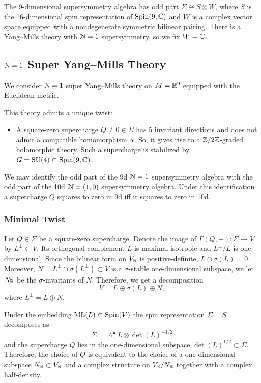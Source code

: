 \documentclass[10pt, oneside]{article}
\newcommand{\ML}{\mathrm{ML}}
\begin{document}
The 9-dimensional supersymmetry algebra has odd part $\Sigma\cong S\otimes W$, where $S$ is the 16-dimensional spin representation of $\mathrm{Spin}(9, \mathbb C)$ and $W$ is a complex vector space equipped with a nondegenerate symmetric bilinear pairing. There is a Yang--Mills theory with $\mathcal{N}=1$ supersymmetry, so we fix $W = \mathbb C$.

\subsection{\texorpdfstring{$\mathcal N=1$}{N=1} Super Yang--Mills Theory}

We consider $\mathcal N=1$ super Yang--Mills theory on $M=\mathbb R^9$ equipped with the Euclidean metric.

This theory admits a unique twist:
\begin{itemize}
\item A square-zero supercharge $Q\neq 0\in\Sigma$ has 5 invariant directions and does not admit a compatible homomorphism $\alpha$. So, it gives rise to a $\mathbb Z/2\mathbb Z$-graded holomorphic theory. Such a supercharge is stabilized by $G=\mathrm{SU}(4)\subset \mathrm{Spin}(9, \mathbb C)$.
\end{itemize}

We may identify the odd part of the 9d $\mathcal{N}=1$ supersymmetry algebra with the odd part of the 10d $\mathcal{N}=(1, 0)$ supersymmetry algebra. Under this identification a supercharge $Q$ squares to zero in 9d iff it squares to zero in 10d.

\subsubsection{Minimal Twist}
\label{sect:9dminimaltwist}

Let $Q\in\Sigma$ be a square-zero supercharge. Denote the image of $\Gamma(Q, -)\colon \Sigma\rightarrow V$ by $L^\perp\subset V$. Its orthogonal complement $L$ is maximal isotropic and $L^{\perp}/L$ is one-dimensional. Since the bilinear form on $V_\mathbb R$ is positive-definite, $L\cap \sigma(L) = 0$. Moreover, $N = L^{\perp}\cap \sigma(L^{\perp})\subset V$ is a $\sigma$-stable one-dimensional subspace, we let $N_\mathbb R$ be the $\sigma$-invariants of $N$. Therefore, we get a decomposition
\[V = L\oplus \sigma(L)\oplus N,\]
where $L^{\perp} = L\oplus N$.

Under the embedding $\ML(L)\subset \Spin(V)$ the spin representation $\Sigma=S$ decomposes as
\[\Sigma = \wedge^\bullet L\otimes \det(L)^{-1/2}\]
and the supercharge $Q$ lies in the one-dimensional subspace $\det(L)^{1/2}\subset \Sigma$. Therefore, the choice of $Q$ is equivalent to the choice of a one-dimensional subspace $N_\mathbb R\subset V_\mathbb R$ and a complex structure on $V_\mathbb R/N_\mathbb R$ together with a complex half-density.
\end{document}
